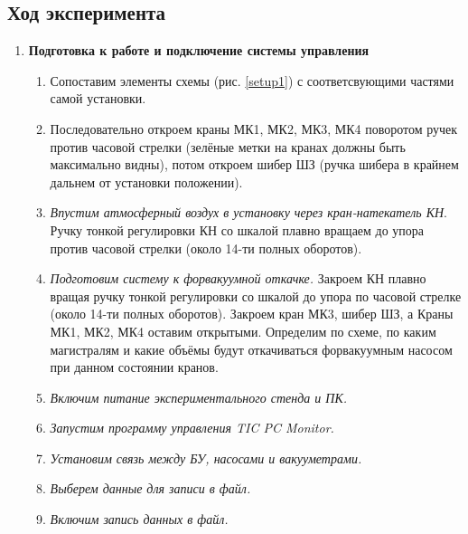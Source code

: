 \documentclass[a4paper,12pt]{article} %
\begin{document}
\subsection{Ход эксперимента}

\begin{enumerate}
\renewcommand{\labelenumi}{\textbf{\Roman{enumi}.}}
\renewcommand{\labelenumii}{\arabic{enumii}.}

\item 
\textbf{Подготовка к работе и подключение системы управления }
\begin{enumerate}
	\item
	Сопоставим элементы схемы (рис. \ref{setup1}) с соответсвующими частями самой установки.
	\item
	Последовательно откроем краны МК1, МК2, МК3, МК4 поворотом ручек против часовой стрелки (зелёные метки на кранах должны быть максимально видны), потом откроем шибер ШЗ (ручка шибера в крайнем дальнем от установки положении). 
	\item
	\textit{Впустим атмосферный воздух в установку через кран-натекатель КН}. Ручку тонкой регулировки КН со шкалой плавно вращаем до упора против часовой стрелки (около 14-ти полных оборотов). 
	\item
	\textit{Подготовим систему к форвакуумной откачке.} Закроем КН плавно вращая ручку тонкой регулировки со шкалой до упора  по часовой  стрелке  (около  14-ти  полных  оборотов).  Закроем кран МК3, шибер ШЗ, а Краны МК1, МК2, МК4 оставим открытыми. Определим по схеме, по каким магистралям и какие объёмы будут откачиваться форвакуумным насосом при данном состоянии кранов. 
	\item \textit{Включим питание экспериментального стенда и ПК.} 
	\item \textit{Запустим программу управления TIC PC Monitor.}
	\item \textit{Установим связь между БУ, насосами и вакууметрами.}
	\item \textit{Выберем данные для записи в файл.}
	\item \textit{Включим запись данных в файл.}
\end{enumerate}


\end{enumerate}
\end{document}
